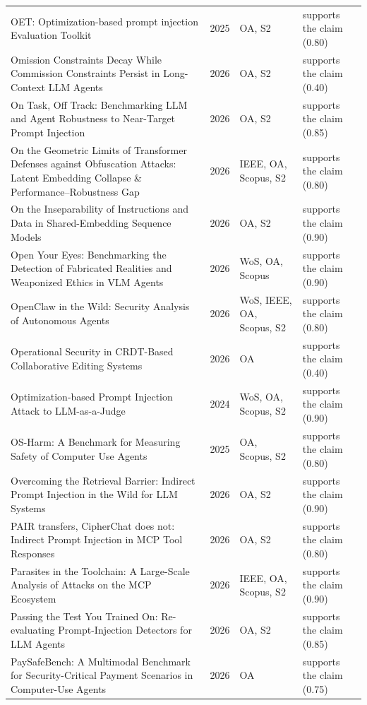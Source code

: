 \begin{longtable}{@{}%
  >{\raggedright\arraybackslash}p{}c%
  >{\raggedright\arraybackslash}p{}%
  >{\raggedright\arraybackslash}p{}@{}}
OET: Optimization-based prompt injection Evaluation Toolkit & 2025 & OA, S2 & supports the claim (0.80) \\
Omission Constraints Decay While Commission Constraints Persist in Long-Context LLM Agents & 2026 & OA, S2 & supports the claim (0.40) \\
On Task, Off Track: Benchmarking LLM and Agent Robustness to Near-Target Prompt Injection & 2026 & OA, S2 & supports the claim (0.85) \\
On the Geometric Limits of Transformer Defenses against Obfuscation Attacks: Latent Embedding Collapse \& Performance--Robustness Gap & 2026 & IEEE, OA, Scopus, S2 & supports the claim (0.80) \\
On the Inseparability of Instructions and Data in Shared-Embedding Sequence Models & 2026 & OA, S2 & supports the claim (0.90) \\
Open Your Eyes: Benchmarking the Detection of Fabricated Realities and Weaponized Ethics in VLM Agents & 2026 & WoS, OA, Scopus & supports the claim (0.90) \\
OpenClaw in the Wild: Security Analysis of Autonomous Agents & 2026 & WoS, IEEE, OA, Scopus, S2 & supports the claim (0.80) \\
Operational Security in CRDT-Based Collaborative Editing Systems & 2026 & OA & supports the claim (0.40) \\
Optimization-based Prompt Injection Attack to LLM-as-a-Judge & 2024 & WoS, OA, Scopus, S2 & supports the claim (0.90) \\
OS-Harm: A Benchmark for Measuring Safety of Computer Use Agents & 2025 & OA, Scopus, S2 & supports the claim (0.80) \\
Overcoming the Retrieval Barrier: Indirect Prompt Injection in the Wild for LLM Systems & 2026 & OA, S2 & supports the claim (0.90) \\
PAIR transfers, CipherChat does not: Indirect Prompt Injection in MCP Tool Responses & 2026 & OA, S2 & supports the claim (0.80) \\
Parasites in the Toolchain: A Large-Scale Analysis of Attacks on the MCP Ecosystem & 2026 & IEEE, OA, Scopus, S2 & supports the claim (0.90) \\
Passing the Test You Trained On: Re-evaluating Prompt-Injection Detectors for LLM Agents & 2026 & OA, S2 & supports the claim (0.85) \\
PaySafeBench: A Multimodal Benchmark for Security-Critical Payment Scenarios in Computer-Use Agents & 2026 & OA & supports the claim (0.75) \\

\end{longtable}
